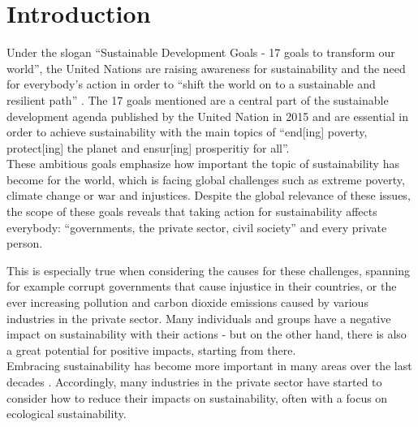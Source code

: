 \chapter{Introduction}
Under the slogan "`Sustainable Development Goals - 17 goals to transform our world"', %
 the United Nations are raising awareness for sustainability and the need for everybody's action in order to "`shift the world on to a sustainable and resilient path"' %
. The 17 goals mentioned are a central part of the sustainable development agenda published by the United Nation in 2015 %
and are essential in order to achieve sustainability with the main topics of "`end[ing] poverty, protect[ing] the planet and ensur[ing] prosperitiy for all"'. %
\\These ambitious goals emphasize how important the topic of sustainability has become for the world, which is facing global challenges such as extreme poverty, climate change or war and injustices. Despite the global relevance of these issues, the scope of these goals reveals that taking action for sustainability affects everybody: "`governments, the private sector, civil society"' and every private person. %

This is especially true when considering the causes for these challenges, spanning for example corrupt governments that cause injustice in their countries, or the ever increasing pollution and carbon dioxide emissions caused by various industries in the private sector. Many individuals and groups %
 have a negative impact on sustainability with their actions - but on the other hand, there is also a great potential for positive impacts, starting from there.\\
 Embracing sustainability has become more important in many areas over the last decades %
. Accordingly, many industries in the private sector have started to consider how to reduce their impacts on sustainability, often with a focus on ecological sustainability.

